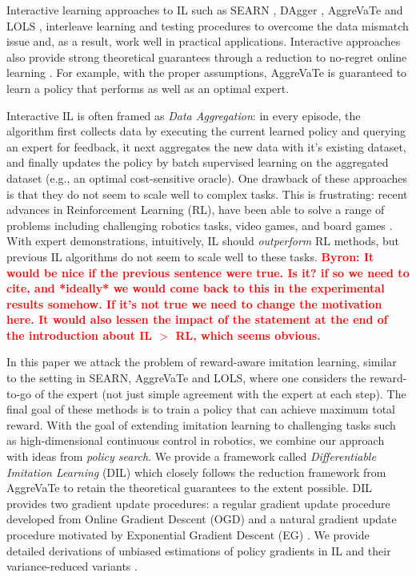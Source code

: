 \documentclass{article}
\newcommand{\BB}[1]{\textcolor{red}{\bf Byron: {#1}}}
\begin{document}
Interactive learning approaches to IL such as SEARN \cite{daume2009search}, DAgger \cite{Ross2011_AISTATS}, AggreVaTe \cite{ross2014reinforcement} and LOLS \cite{chang2015learning}, interleave learning and testing procedures to overcome the data mismatch issue and, as a result, work well in practical applications. 
Interactive approaches also provide strong theoretical guarantees through a reduction to no-regret online learning \cite{Zinkevich2003_ICML,shalev2012online}. For example, with the proper assumptions, AggreVaTe \cite{ross2014reinforcement} is guaranteed to learn a policy that performs as well as an optimal expert.%


Interactive IL is often framed as \emph{Data Aggregation}: in every episode, the algorithm first collects data by executing the current learned policy and querying an expert for feedback, it next aggregates the new data with it's existing dataset, and finally updates the policy by batch supervised learning on the aggregated dataset (e.g., an optimal cost-sensitive oracle). One drawback of these approaches is that they do not seem to scale well to complex tasks. This is frustrating: recent advances in Reinforcement Learning (RL), have been able to solve a range of problems including challenging robotics tasks, video games, and board games \cite{schulman2015trust,duan2016benchmarking,silver2016mastering}. With expert demonstrations, intuitively, IL should \emph{outperform} RL methods, but previous IL algorithms do not seem to scale well to these tasks. \BB{It would be nice if the previous sentence were true. Is it? if so we need to cite, and *ideally* we would come back to this in the experimental results somehow. If it's not true we need to change the motivation here. It would also lessen the impact of the statement at the end of the introduction about IL $>$ RL, which seems obvious. }

In this paper we attack the problem of reward-aware imitation learning, similar to the setting in SEARN, AggreVaTe and LOLS, where one considers the reward-to-go of the expert (not just  simple agreement with the expert at each step). The final goal of these methods is to train a policy that can achieve maximum total reward. 
With the goal of extending imitation learning to challenging tasks such as high-dimensional continuous control in robotics, we combine our approach with ideas from \emph{policy search}. We provide a framework called \emph{Differentiable  Imitation Learning} (DIL) which closely follows the reduction framework from AggreVaTe \cite{ross2014reinforcement} to retain the theoretical guarantees to the extent possible. DIL provides two gradient update procedures: a regular gradient update procedure developed from Online Gradient Descent (OGD) \cite{Zinkevich2003_ICML} and a natural gradient update procedure motivated by Exponential Gradient Descent (EG) \cite{shalev2012online}. We provide detailed derivations of unbiased estimations of policy gradients in IL and their variance-reduced variants \cite{greensmith2004variance}. 
\end{document}
